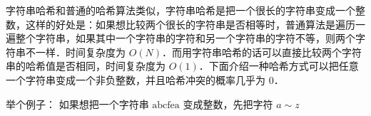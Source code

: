 
字符串哈希和普通的哈希算法类似，字符串哈希是把一个很长的字符串变成一个整数，这样的好处是：如果想比较两个很长的字符串是否相等时，普通算法是遍历一遍整个字符串，如果其中一个字符串的字符和另一个字符串的字符不等，则两个字符串不一样．时间复杂度为 $O(N)$．而用字符串哈希的话可以直接比较两个字符串的哈希值是否相同，时间复杂度为 $O(1)$．下面介绍一种哈希方式可以把任意一个字符串变成一个非负整数，并且哈希冲突的概率几乎为 $0$．

举个例子：
如果想把一个字符串 $\text{abcfea}$ 变成整数，先把字符 $a \sim z$